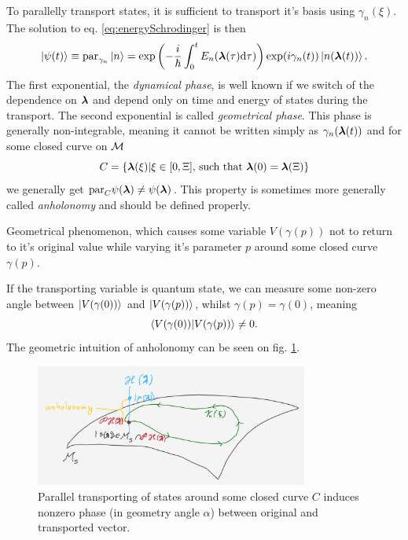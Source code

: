 To parallelly transport states, it is sufficient to transport it's basis using $\gamma_n(\xi)$. The solution to eq. \ref{eq:energySchrodinger} is then
\begin{equation}
    \ket{\psi(t)} \equiv \textrm{par}_{\gamma_n}\ket{n} = \exp\left(-\frac{i}{\hbar}\int_0^tE_n({\bm\lambda}(\tau)\mathrm{d}\tau)\right)\exp(i\gamma_n(t))\ket{n({\bm\lambda}(t))}.
    \label{eq:phasesOnManifold}
\end{equation}
The first exponential, the \emph{dynamical phase}, is well known if we switch of the dependence on ${\bm\lambda}$ and depend only on time and energy of states during the transport. The second exponential is called \emph{geometrical phase}. This phase is generally non-integrable, meaning it cannot be written simply as $\gamma_n({\bm\lambda}(t))$ and for some closed curve on $\mathcal{M}$
\begin{equation}
    C=\{{\bm\lambda}(\xi)|\xi\in[0,\Xi] \text{, such that }{\bm\lambda}(0)={\bm\lambda}(\Xi)\}
\end{equation} 
we generally get $\textrm{par}_C \psi({\bm\lambda})\neq \psi({\bm\lambda})$. This property is sometimes more generally called \emph{anholonomy} and should be defined properly.
\begin{definition}[Anholonomy]
    Geometrical phenomenon, which causes some variable $V(\gamma(p))$ not to return to it's original value while varying it's parameter $p$ around some closed curve $\gamma(p)$. 
\end{definition}
If the transporting variable is quantum state, we can measure some non-zero angle between $\ket{V(\gamma(0))}$ and $\ket{V(\gamma(p))}$, whilst $\gamma(p)=\gamma(0)$, meaning
$$\braket{V(\gamma(0))|V(\gamma(p))}\neq 0.$$ 
The geometric intuition of anholonomy can be seen on fig. \ref{fig:parallelTransportClosed}.

\begin{figure}[h]
    \centering
    \includegraphics[width=0.8\textwidth]{../img/parallelTransportClosedCurve.png}
\caption{Parallel transporting of states around some closed curve $C$ induces nonzero phase (in geometry angle $\alpha$) between original and transported vector.}
    \label{fig:parallelTransportClosed}
\end{figure}

